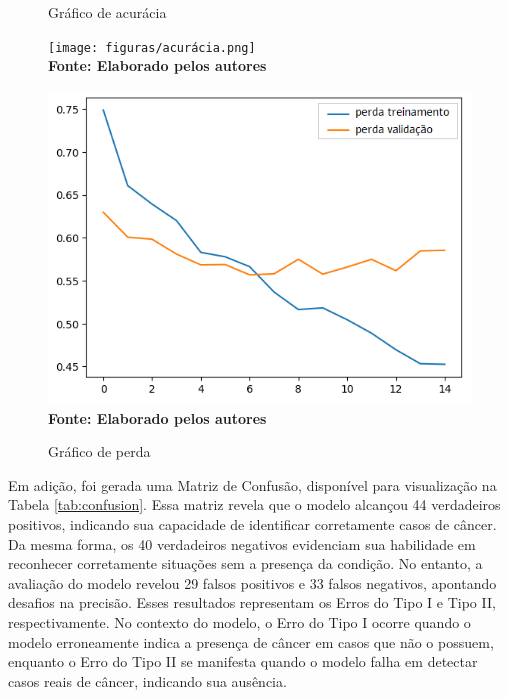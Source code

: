 \begin{figure}[ht]
\centering
\begin{minipage}{0.45\textwidth}
  \centering
  \caption[\hspace{0.1cm}Grade Computacional.]{Gráfico de acurácia}
  \vspace{-0.4cm}
  \texttt{[image: figuras/acurácia.png]}
  \captionsetup{justification=centering}
  \vspace{-0.2cm}
  \\\textbf{\footnotesize Fonte: Elaborado pelos autores}
  \label{fig:acc}
\end{minipage}\hfill
\begin{minipage}{0.45\textwidth}
  \centering
  \caption[\hspace{0.1cm}Grade Computacional.]{Gráfico de perda}
  \vspace{-0.4cm}
  \includegraphics[width=\linewidth]{figuras/perda.png}
  \captionsetup{justification=centering}
  \vspace{-0.2cm}
  \\\textbf{\footnotesize Fonte: Elaborado pelos autores}
  \label{fig:loss}
\end{minipage}
\end{figure}

Em adição, foi gerada uma Matriz de Confusão, disponível para visualização na Tabela \ref{tab:confusion}. Essa matriz revela que o modelo alcançou 44 verdadeiros positivos, indicando sua capacidade de identificar corretamente casos de câncer. Da mesma forma, os 40 verdadeiros negativos evidenciam sua habilidade em reconhecer corretamente situações sem a presença da condição. No entanto, a avaliação do modelo revelou 29 falsos positivos e 33 falsos negativos, apontando desafios na precisão. Esses resultados representam os Erros do Tipo I e Tipo II, respectivamente. No contexto do modelo, o Erro do Tipo I ocorre quando o modelo erroneamente indica a presença de câncer em casos que não o possuem, enquanto o Erro do Tipo II se manifesta quando o modelo falha em detectar casos reais de câncer, indicando sua ausência.

